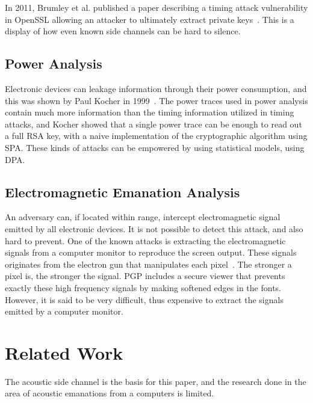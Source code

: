 In 2011, Brumley et al. published a paper describing a timing attack vulnerability in OpenSSL allowing an attacker to ultimately extract private keys~\cite{DBLP:conf/esorics/BrumleyT11}.
This is a display of how even known side channels can be hard to silence.


\subsection{Power Analysis}\label{chp2:subsec:power_analysis}
Electronic devices can leakage information through their power consumption, and this was shown by Paul Kocher in 1999~\cite{DBLP:conf/crypto/KocherJJ99}.
The power traces used in power analysis contain much more information than the timing information utilized in timing attacks, and Kocher showed that a single power trace can be enough to read out a full RSA key, with a naive implementation of the cryptographic algorithm using \gls{SPA}.
These kinds of attacks can be empowered by using statistical models, using \gls{DPA}.


\subsection{Electromagnetic Emanation Analysis}\label{chp2:subsec:electromagnetic_attacks}
An adversary can, if located within range, intercept electromagnetic signal emitted by all electronic devices. 
It is not possible to detect this attack, and also hard to prevent. 
One of the known attacks is extracting the electromagnetic signals from a computer monitor to reproduce the screen output.
These signals originates from the electron gun that manipulates each pixel~\cite{url:tempest_sans}. 
The stronger a pixel is, the stronger the signal.
PGP includes a secure viewer that prevents exactly these high frequency signals by making softened edges in the fonts.
However, it is said to be very difficult, thus expensive to extract the signals emitted by a computer monitor. 


\section{Related Work}\label{chp2:sec:related_work}
The acoustic side channel is the basis for this paper, and the research done in the area of acoustic emanations from a computers is limited.

